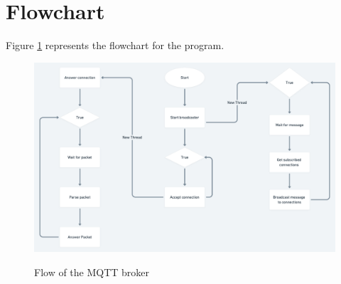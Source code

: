 \documentclass{article}
\begin{document}
\newpage
\section{Flowchart}
Figure \ref{fig:MQTT} represents the flowchart for the program.
\begin{figure}[H]
	\centering
    \includegraphics[width=1\textwidth]{MQTT2.png}
	\label{fig:MQTT}
	\caption{Flow of the MQTT broker}
\end{figure}
\end{document}
